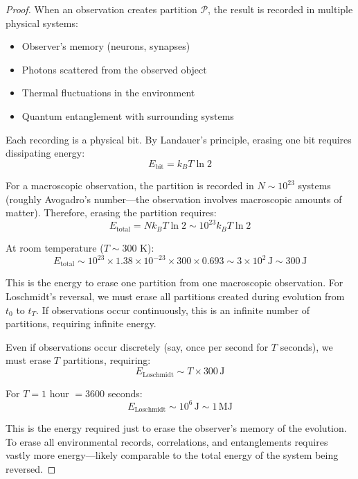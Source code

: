 \documentclass[twocolumn,10pt]{article}
\theoremstyle{definition}
\theoremstyle{remark}
\begin{document}
\begin{proof}
When an observation creates partition $\mathcal{P}$, the result is recorded in multiple physical systems:
\begin{itemize}
\item Observer's memory (neurons, synapses)
\item Photons scattered from the observed object
\item Thermal fluctuations in the environment
\item Quantum entanglement with surrounding systems
\end{itemize}

Each recording is a physical bit. By Landauer's principle\cite{landauer1961}, erasing one bit requires dissipating energy:
\begin{equation}
E_{\text{bit}} = k_B T \ln 2
\end{equation}

For a macroscopic observation, the partition is recorded in $N \sim 10^{23}$ systems (roughly Avogadro's number—the observation involves macroscopic amounts of matter). Therefore, erasing the partition requires:
\begin{equation}
E_{\text{total}} = N k_B T \ln 2 \sim 10^{23} k_B T \ln 2
\end{equation}

At room temperature ($T \sim 300$ K):
\begin{equation}
E_{\text{total}} \sim 10^{23} \times 1.38 \times 10^{-23} \times 300 \times 0.693 \sim 3 \times 10^2 \, \text{J} \sim 300 \, \text{J}
\end{equation}

This is the energy to erase one partition from one macroscopic observation. For Loschmidt's reversal, we must erase all partitions created during evolution from $t_0$ to $t_T$. If observations occur continuously, this is an infinite number of partitions, requiring infinite energy.

Even if observations occur discretely (say, once per second for $T$ seconds), we must erase $T$ partitions, requiring:
\begin{equation}
E_{\text{Loschmidt}} \sim T \times 300 \, \text{J}
\end{equation}

For $T = 1$ hour $= 3600$ seconds:
\begin{equation}
E_{\text{Loschmidt}} \sim 10^6 \, \text{J} \sim 1 \, \text{MJ}
\end{equation}

This is the energy required just to erase the observer's memory of the evolution. To erase all environmental records, correlations, and entanglements requires vastly more energy—likely comparable to the total energy of the system being reversed.
\end{proof}
\end{document}
